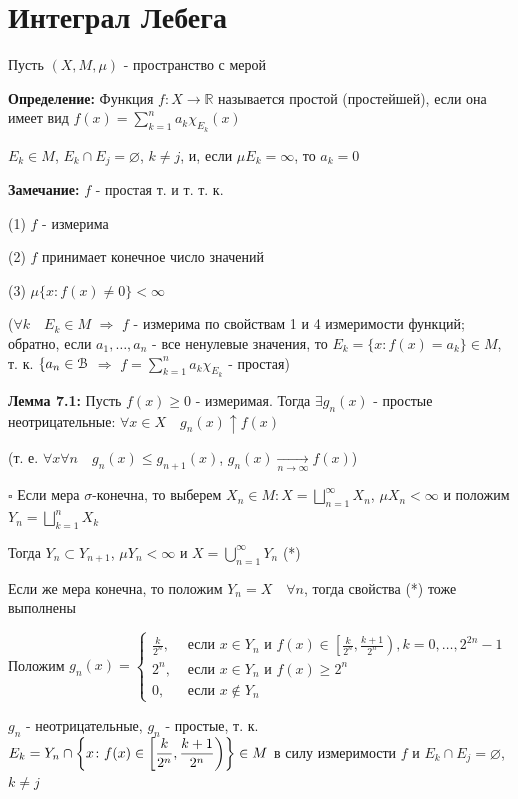 \documentclass[a4paper]{report}
\newcommand*{\hm}[1]{#1\nobreak\discretionary{}%
            {\hbox{$\mathsurround=0pt #1$}}{}}
\begin{document}
\chapter{Интеграл Лебега}

Пусть $(X,M,\mu)$ - пространство с мерой

\noindent\textbf{Определение:} Функция $f\colon X\to\mathbb R$ называется простой (простейшей), если она имеет вид $f(x)=\sum\limits_{k=1}^n a_k\chi_{E_k}(x)$

$E_k\in M$, $E_k\cap E_j=\varnothing$, $k\ne j$, и, если $\mu E_k=\infty$, то $a_k=0$
\bigskip

\noindent\textbf{Замечание:} $f$ - простая т. и т. т. к.

(1) $f$ - измерима

(2) $f$ принимает конечное число значений

(3) $\mu\{x\colon f(x)\ne0\}<\infty$

\noindent ($\forall k\quad E_k\in M$ $\Rightarrow$ $f$ - измерима по свойствам 1 и 4 измеримости функций; обратно, если $a_1,\ldots,a_n$ - все ненулевые значения, то
$E_k=\{x\colon f(x)=a_k\}\in M$, т. к. $\{a_n\in\EuScript B$ $\Rightarrow$ $f=\sum\limits_{k=1}^n a_k\chi_{E_k}$ - простая)
\bigskip

\noindent\textbf{Лемма 7.1:} Пусть $f(x)\ge0$ - измеримая. Тогда $\exists g_n(x)$ - простые неотрицательные: $\forall x\in X\quad g_n(x)\uparrow f(x)$

(т. е. $\forall x\forall n\quad g_n(x)\le g_{n+1}(x)$, $g_n(x)\xrightarrow[n\to\infty]{}f(x)$)

\noindent $\square$ Если мера $\sigma$-конечна, то выберем $X_n\in M\colon X=\bigsqcup\limits_{n=1}^\infty X_n$, $\mu X_n<\infty$ и положим $Y_n=\bigsqcup\limits_{k=1}^n X_k$

Тогда $Y_n\subset Y_{n+1}$, $\mu Y_n<\infty$ и $X=\bigcup\limits_{n=1}^\infty Y_n$ (*)

Если же мера конечна, то положим $Y_n=X\quad\forall n$, тогда свойства (*) тоже выполнены

Положим $g_n(x)=\begin{cases}\displaystyle\frac{k}{2^n},&\text{ если } x\in Y_n\text{ и } f(x)\in\left[\displaystyle\frac{k}{2^n},\displaystyle\frac{k+1}{2^n}\right),k=0,\ldots,2^{2n}-1\\2^n,&\text{ если } x\in Y_n \text{ и } f(x)\ge2^n\\0,&\text{ если } x\notin Y_n\end{cases}$

\noindent
$g_n$ - неотрицательные, $g_n$ - простые, т. к. $E_k=Y_n\cap\biggl\{x\colon f(x)\in\left[\displaystyle\frac{k}{2^n},\displaystyle\frac{k+1}{2^n}\right)\biggr\}\hm\in M$ в силу измеримости $f$ и $E_k\cap E_j=\varnothing$, $k\ne j$
\end{document}
